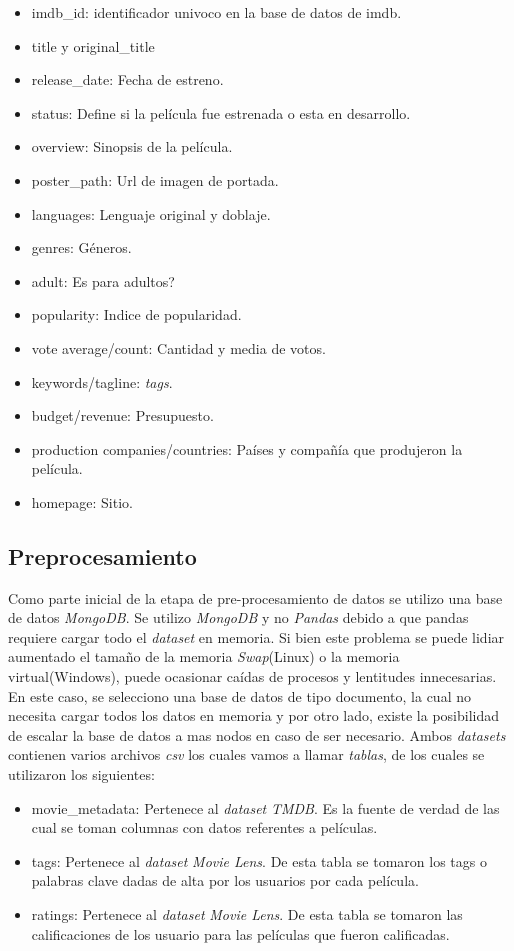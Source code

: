 \documentclass[11pt,a4paper,twoside]{thesis}
\begin{document}
\begin{itemize}
	\item imdb\_id: identificador univoco en la base de datos de imdb.
	\item title y original\_title
	\item release\_date: Fecha de estreno.
	\item status: Define si la película fue estrenada o esta en desarrollo.
	\item overview:	Sinopsis de la película.
	\item poster\_path: Url de imagen de portada.
	\item languages: Lenguaje original y doblaje.
	\item genres: Géneros.
	\item adult: Es para adultos?
	\item popularity: Indice de popularidad.
	\item vote average/count: Cantidad y media de votos.
	\item keywords/tagline: \textit{tags}.
	\item budget/revenue: Presupuesto.
	\item production companies/countries: Países y compañía que produjeron la película. 
	\item homepage: Sitio.
\end{itemize}


\subsection{Preprocesamiento}

Como parte inicial de la etapa de pre-procesamiento de datos se utilizo una base de datos \textit{MongoDB}. Se utilizo \textit{MongoDB} y no \textit{Pandas} debido a que pandas requiere cargar todo el \textit{dataset} en memoria. Si bien este problema se puede lidiar aumentado el tamaño de la memoria \textit{Swap}(Linux) o la memoria virtual(Windows), puede ocasionar caídas de procesos y lentitudes innecesarias. En este caso, se selecciono una base de datos de tipo documento, la cual no necesita cargar todos los datos en memoria y por otro lado, existe la posibilidad de escalar la base de datos a mas nodos en caso de ser necesario.
Ambos \textit{datasets} contienen varios archivos \textit{csv} los cuales vamos a llamar \textit{tablas}, de los cuales se utilizaron los siguientes:

\begin{itemize}
	\item movie\_metadata: Pertenece al \textit{dataset} \textit{TMDB}. Es la fuente de verdad de las cual se toman columnas con datos referentes a películas.
	\item tags: Pertenece al \textit{dataset} \textit{Movie Lens}. De esta tabla se tomaron los tags o palabras clave dadas de alta por los usuarios por cada película.
	\item ratings: Pertenece al \textit{dataset} \textit{Movie Lens}. De esta tabla se tomaron las calificaciones de los usuario para las películas que fueron calificadas.
\end{itemize}
\end{document}
